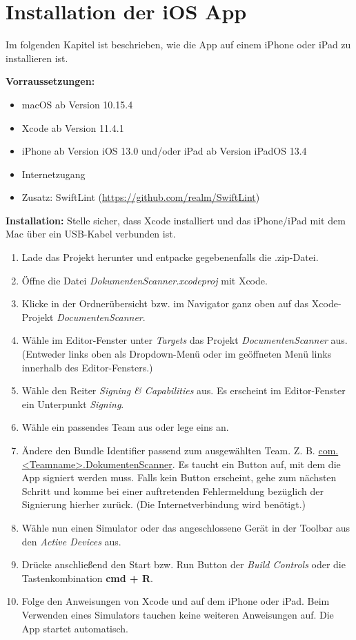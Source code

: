 \documentclass[notables, nomenclature, oneside, 150]{HSMW-Thesis}
\begin{document}
	
\chapter{Installation der iOS App}\label{ch:installation}
	Im folgenden Kapitel ist beschrieben, wie die App auf einem iPhone oder iPad zu installieren ist.
	
	\textbf{Vorraussetzungen:}
	\begin{itemize}
		\item macOS ab Version 10.15.4 
		\item Xcode ab Version 11.4.1 
		\item iPhone ab Version iOS 13.0 und/oder iPad ab Version iPadOS 13.4 
		\item Internetzugang
		\item Zusatz: SwiftLint (\url{https://github.com/realm/SwiftLint})
	\end{itemize}
	
	\textbf{Installation:}
	Stelle sicher, dass Xcode installiert und das iPhone/iPad mit dem Mac über ein USB-Kabel verbunden ist.
	\begin{enumerate}
		\item Lade das Projekt herunter und entpacke gegebenenfalls die .zip-Datei.
		\item Öffne die Datei \textit{DokumentenScanner.xcodeproj} mit Xcode.
		\item Klicke in der Ordnerübersicht bzw. im Navigator ganz oben auf das Xcode-Projekt \textit{DocumentenScanner}.
		\item Wähle im Editor-Fenster unter \textit{Targets} das Projekt \textit{DocumentenScanner} aus. (Entweder links oben als Dropdown-Menü oder im geöffneten Menü links innerhalb des Editor-Fensters.)
		\item Wähle den Reiter \textit{Signing \& Capabilities} aus. Es erscheint im Editor-Fenster ein Unterpunkt \textit{Signing}.
		\item Wähle ein passendes Team aus oder lege eins an.
		\item Ändere den Bundle Identifier passend zum ausgewählten Team. Z. B. \url{com.<Teamname>.DokumentenScanner}. Es taucht ein Button auf, mit dem die App signiert werden muss. Falls kein Button erscheint, gehe zum nächsten Schritt und komme bei einer auftretenden Fehlermeldung bezüglich der Signierung hierher zurück. (Die Internetverbindung wird benötigt.)
		\item Wähle nun einen Simulator oder das angeschlossene Gerät in der Toolbar aus den \textit{Active Devices} aus.
		\item Drücke anschließend den Start bzw. Run Button der \textit{Build Controls} oder die Tastenkombination \textbf{cmd + R}.
		\item Folge den Anweisungen von Xcode und auf dem iPhone oder iPad. Beim Verwenden eines Simulators tauchen keine weiteren Anweisungen auf. Die App startet automatisch. 
	\end{enumerate}
	
\end{document}
